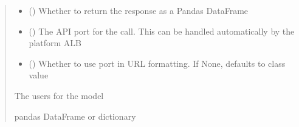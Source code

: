 \documentclass[letterpaper,10pt,english]{sphinxmanual}
\begin{document}
\begin{fulllineitems}
\begin{fulllineitems}
\begin{quote}
\begin{description}
\begin{itemize}
\item {} 
\sphinxAtStartPar
{} (\sphinxstyleliteralemphasis{\sphinxupquote{ (}}\sphinxstyleliteralemphasis{\sphinxupquote{)}}) \textendash{} Whether to return the response as a Pandas DataFrame

\item {} 
\sphinxAtStartPar
{} (\sphinxstyleliteralemphasis{\sphinxupquote{ (}}\sphinxstyleliteralemphasis{\sphinxupquote{)}}) \textendash{} The API port for the call. This can be handled automatically by the platform ALB

\item {} 
\sphinxAtStartPar
{} (\sphinxstyleliteralemphasis{\sphinxupquote{ (}}\sphinxstyleliteralemphasis{\sphinxupquote{)}}) \textendash{} Whether to use port in URL formatting. If None, defaults to class value

\end{itemize}

\sphinxAtStartPar
{} \textendash{} The users for the model

\sphinxAtStartPar
pandas DataFrame or dictionary

\end{description}\end{quote}

\end{fulllineitems}



\end{fulllineitems}
\end{document}
